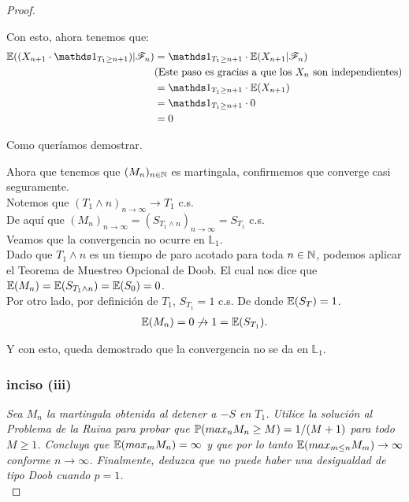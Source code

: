 \begin{proof}
\begin{itemize}
				Con esto, ahora tenemos que:
				\begin{align}
					\E((X_{n+1} \cdot \indic_{T_1 \geq n+1}) | \F_{n}) &= \indic_{T_1 \geq n+1} \cdot \E(X_{n+1} | \F_{n}) \\
					&\mbox{(Este paso es gracias a que los $X_n$ son independientes)} \\
					&=\indic_{T_1 \geq n+1} \cdot \E(X_{n+1} ) \\
					&=\indic_{T_1 \geq n+1} \cdot 0 \\
					&= 0
				\end{align}	
				
				Como queríamos demostrar.
		\end{itemize}
		
		Ahora que tenemos que $(M_n)_{n \in \mathbb{N}}$ es martingala, confirmemos que converge casi seguramente.\\
		
		Notemos que $(T_1 \wedge n)_{n \rightarrow \infty} \rightarrow T_1$ c.s.\\
		
		De aquí que $(M_n)_{n \rightarrow \infty} = (S_{T_1 \wedge n})_{n \rightarrow \infty} = S_{T_1}$ c.s. \\				
		
		Veamos que la convergencia no ocurre en $\mathbb{L}_1$. \\
					
		Dado que $T_1 \wedge n$ es un tiempo de paro acotado para toda $n \in \mathbb{N}$,
		podemos aplicar el Teorema de Muestreo Opcional de 	Doob. 
		El cual nos dice que $\mathbb{E}(M_n) = \mathbb{E}(S_{T_1 \wedge n}) = \mathbb{E}(S_0) = 0$.\\
		
		Por otro lado, por definición de $T_1$, $S_{T_1} = 1$ c.s.	De donde $\mathbb{E}(S_T) = 1$.\\
		
		\begin{align}
			\mathbb{E}(M_n) = 0 \not\rightarrow 1 = \mathbb{E}(S_{T_1}).
		\end{align}			
		
		Y con esto, queda demostrado que la convergencia no se da en $\mathbb{L}_1$.\\
		
	\subsubsection{inciso (iii)}		
	\emph{
		Sea $M_n$ la martingala obtenida al detener a $-S$ en $T_1$. Utilice la solución al
		Problema de la Ruina para probar que $\mathbb{P}(max_n M_n \geq M) = 1/(M+1)$ para todo $M \geq 1$. Concluya que
		$\mathbb{E}(max_m M_n) = \infty$ y que por lo tanto $\mathbb{E}(max_{m\leq n} M_m) \rightarrow \infty$ conforme 
		$n \rightarrow \infty$. Finalmente, deduzca que no puede haber una desigualdad de tipo Doob cuando $p=1$.\\
	}	


\end{proof}
